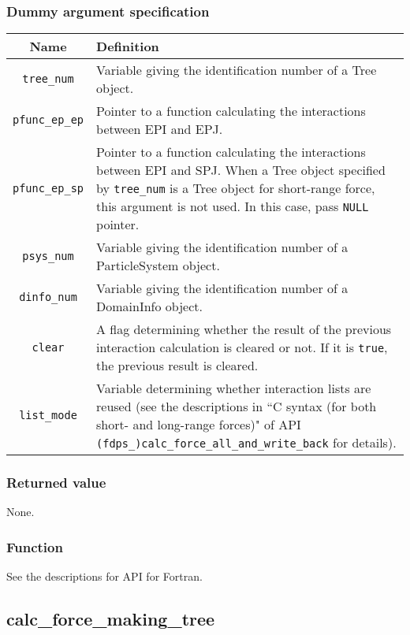 \subsubsection*{Dummy argument specification}
\begin{table}[h]
\begin{tabularx}{\linewidth}{cX}
\toprule
\rowcolor{Snow2}
Name & Definition \\
\midrule
\verb|tree_num|    & Variable giving the identification number of a Tree object.\\
\verb|pfunc_ep_ep| & Pointer to a function calculating the interactions between EPI and EPJ.\\
\verb|pfunc_ep_sp| & Pointer to a function calculating the interactions between EPI and SPJ. When a Tree object specified by \verb|tree_num| is a Tree object for short-range force, this argument is not used. In this case, pass \texttt{NULL} pointer.\\
\verb|psys_num|    & Variable giving the identification number of a ParticleSystem object.\\
\verb|dinfo_num|   & Variable giving the identification number of a DomainInfo object.\\
\verb|clear|       & A flag determining whether the result of the previous interaction calculation is cleared or not. If it is \texttt{true}, the previous result is cleared.\\
\verb|list_mode|   & Variable determining whether interaction lists are reused (see the descriptions in ``C syntax (for both short- and long-range forces)" of API \texttt{(fdps\_)calc\_force\_all\_and\_write\_back} for details).\\

\bottomrule
\end{tabularx}
\end{table}

\subsubsection*{Returned value}
None.

\subsubsection*{Function}
See the descriptions for API for Fortran.
\clearpage

\subsection{calc\_force\_making\_tree}
